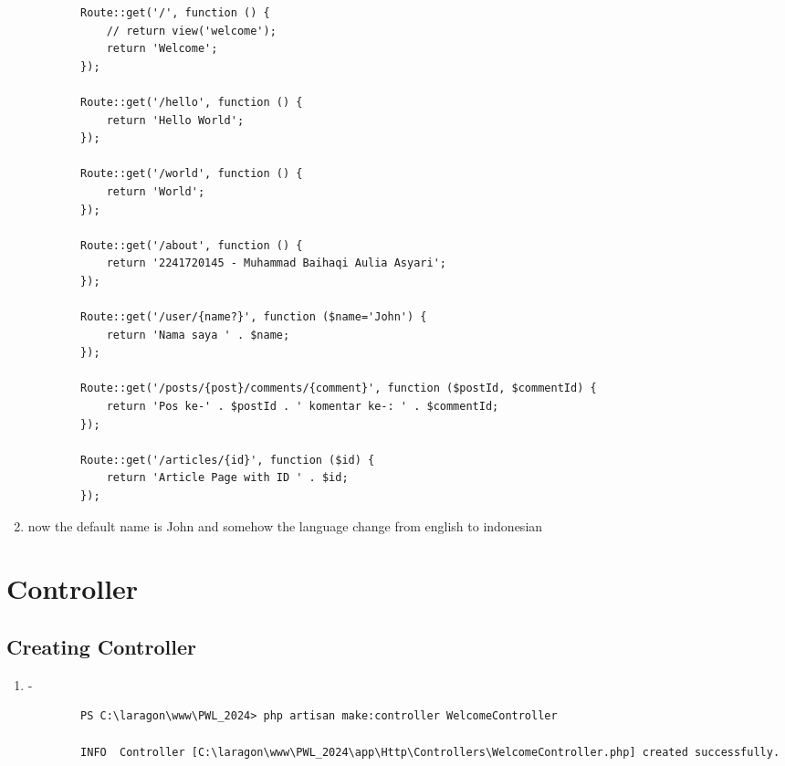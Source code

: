\documentclass[12pt,titlepage]{article}
\begin{document}
\begin{enumerate}[label=\alph*.]
\begin{verbatim}
        Route::get('/', function () {
            // return view('welcome');
            return 'Welcome';
        });
        
        Route::get('/hello', function () {
            return 'Hello World';
        });
        
        Route::get('/world', function () {
            return 'World';
        }); 
        
        Route::get('/about', function () {
            return '2241720145 - Muhammad Baihaqi Aulia Asyari';
        }); 
        
        Route::get('/user/{name?}', function ($name='John') {
            return 'Nama saya ' . $name;
        }); 
        
        Route::get('/posts/{post}/comments/{comment}', function ($postId, $commentId) {
            return 'Pos ke-' . $postId . ' komentar ke-: ' . $commentId;
        });
        
        Route::get('/articles/{id}', function ($id) {
            return 'Article Page with ID ' . $id;
        });        
    \end{verbatim}
    \item now the default name is John and somehow the language change from english to indonesian
\end{enumerate}

\section{Controller}
\subsection{Creating Controller}

\begin{enumerate}[label=\alph*.]
    \item -
    \begin{verbatim}
        PS C:\laragon\www\PWL_2024> php artisan make:controller WelcomeController

        INFO  Controller [C:\laragon\www\PWL_2024\app\Http\Controllers\WelcomeController.php] created successfully.
    \end{verbatim}
\end{enumerate}
\end{document}
